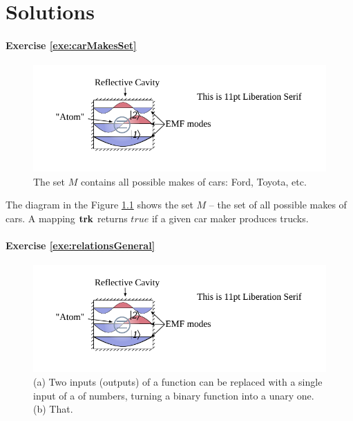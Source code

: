 \graphicspath{{../09Solutions/pics/}}

\chapter{Solutions}\label{ch:Solutions}
\footnotesize

\subsubsection*{Exercise \ref{exe:carMakesSet}}

\begin{figure}[htbp]
  \centering
  \includegraphics[scale=1.0]{defaultFigureTemplate}
  \caption{The set $M$ contains all possible makes of cars: Ford,
    Toyota, etc.}
  \label{fig:diagramCars}
\end{figure}

The diagram in the Figure \ref{fig:diagramCars} shows the set $M$ -- the set
of all possible makes of cars. A mapping $\textrm{\bf {trk}}$ returns $true$ if a
given car maker produces trucks.

\subsubsection*{Exercise \ref{exe:relationsGeneral}}
\begin{figure}[htbp]
  \centering
  \includegraphics[scale=1.0]{defaultFigureTemplate}
  \caption{(a) Two inputs (outputs) of a function can be replaced with
    a single input of a  of numbers, turning a binary
    function into a unary one. (b) That.}
  \label{fig:diagramProductSet}
\end{figure}

